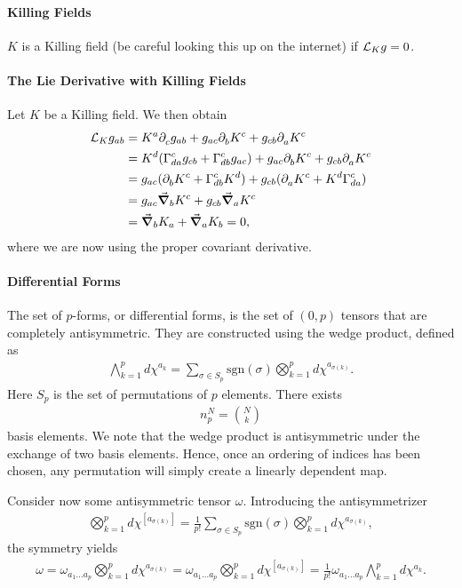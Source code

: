 \paragraph{Killing Fields}
$K$ is a Killing field (be careful looking this up on the internet) if $\mathcal{L}_{K}g = 0$.

\paragraph{The Lie Derivative with Killing Fields}
Let $K$ be a Killing field. We then obtain
\begin{align*}
\lied{K}{g_{ab}} &= K^{a}\del{c}{g_{ab}} + g_{ac}\del{b}{K^{c}} + g_{cb}\del{a}{K^{c}} \\
&= K^{d}(\chris{c}{d}{a}g_{cb} + \chris{c}{d}{b}g_{ac}) + g_{ac}\del{b}{K^{c}} + g_{cb}\del{a}{K^{c}} \\
&= g_{ac}(\del{b}{K^{c}} + \chris{c}{d}{b}K^{d}) + g_{cb}(\del{a}{K^{c}} + K^{d}\chris{c}{d}{a}) \\
&= g_{ac}\dcov{b}{K^{c}} + g_{cb}\dcov{a}{K^{c}} \\
&= \dcov{b}{K_{a}} + \dcov{a}{K_{b}} = 0,
\end{align*}
where we are now using the proper covariant derivative.

\paragraph{Differential Forms}
The set of $p$-forms, or differential forms, is the set of $(0, p)$ tensors that are completely antisymmetric. They are constructed using the wedge product, defined as
\begin{align*}
\bigwedge\limits_{k = 1}^{p}d\chi^{a_{k}} = \sum\limits_{\sigma\in S_{p}}\text{sgn}(\sigma)\bigotimes_{k = 1}^{p}d\chi^{a_{\sigma(k)}}.
\end{align*}
Here $S_{p}$ is the set of permutations of $p$ elements. There exists
\begin{align*}
n_{p}^{N} = {N\choose k}
\end{align*}
basis elements. We note that the wedge product is antisymmetric under the exchange of two basis elements. Hence, once an ordering of indices has been chosen, any permutation will simply create a linearly dependent map.

Consider now some antisymmetric tensor $\omega$. Introducing the antisymmetrizer
\begin{align*}
\bigotimes_{k = 1}^{p}d\chi^{[a_{\sigma(k)}]} = \frac{1}{p!}\sum\limits_{\sigma\in S_{p}}\text{sgn}(\sigma)\bigotimes_{k = 1}^{p}d\chi^{a_{\sigma(k)}},
\end{align*}
the symmetry yields
\begin{align*}
\omega = \omega_{a_{1}\dots a_{p}}\bigotimes_{k = 1}^{p}d\chi^{a_{\sigma(k)}} = \omega_{a_{1}\dots a_{p}}\bigotimes_{k = 1}^{p}d\chi^{[a_{\sigma(k)}]} = \frac{1}{p!}\omega_{a_{1}\dots a_{p}}\bigwedge\limits_{k = 1}^{p}d\chi^{a_{k}}.
\end{align*}

